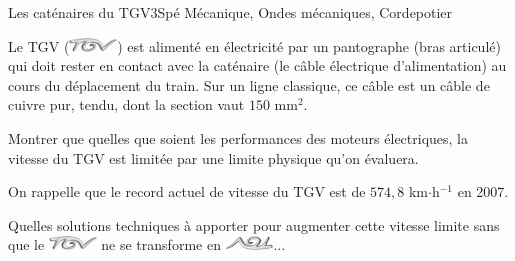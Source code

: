 
\begin{exercise}{Les caténaires du TGV}{3}{Spé}
{Mécanique, Ondes mécaniques, Corde}{potier}

Le TGV (\includegraphics[height=1em]{meca/ondes_meca/TGV.png}) est alimenté en électricité par un pantographe (bras articulé) qui doit rester en contact avec la caténaire (le câble électrique d’alimentation) au cours du déplacement du train. Sur un ligne classique, ce câble est un câble de cuivre pur, tendu, dont la section vaut $150$  mm$^2$.

Montrer que quelles que soient les performances des moteurs électriques, la vitesse
du TGV est limitée par une limite physique qu’on évaluera.

On rappelle que le record actuel de vitesse du TGV est de $574,8$ km$\cdot$h$^{-1}$ en 2007.

Quelles solutions techniques à apporter pour augmenter cette vitesse limite sans que le \includegraphics[height=1em]{meca/ondes_meca/TGV.png} ne se transforme en \includegraphics[height=1em]{meca/ondes_meca/GTV.png}...
\end{exercise}